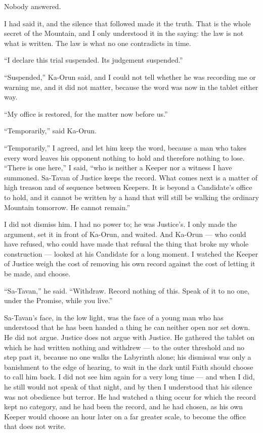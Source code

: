 Nobody answered.\par
 
I had said it, and the silence that followed made it the truth. That is the whole secret of the Mountain, and I only understood it in the saying: the law is not what is written. The law is what no one contradicts in time.\par
 
``I declare this trial suspended. Its judgement suspended.''\par
 
``Suspended,'' Ka-Orun said, and I could not tell whether he was recording me or warning me, and it did not matter, because the word was now in the tablet either way.\par
 
``My office is restored, for the matter now before us.''\par
 
``Temporarily,'' said Ka-Orun.\par
 
``Temporarily,'' I agreed, and let him keep the word, because a man who takes every word leaves his opponent nothing to hold and therefore nothing to lose. ``There is one here,'' I said, ``who is neither a Keeper nor a witness I have summoned. Sa-Tavan of Justice keeps the record. What comes next is a matter of high treason and of sequence between Keepers. It is beyond a Candidate's office to hold, and it cannot be written by a hand that will still be walking the ordinary Mountain tomorrow. He cannot remain.''\par
 
I did not dismiss him. I had no power to; he was Justice's. I only made the argument, set it in front of Ka-Orun, and waited. And Ka-Orun — who could have refused, who could have made that refusal the thing that broke my whole construction — looked at his Candidate for a long moment. I watched the Keeper of Justice weigh the cost of removing his own record against the cost of letting it be made, and choose.\par
 
``Sa-Tavan,'' he said. ``Withdraw. Record nothing of this. Speak of it to no one, under the Promise, while you live.''\par
 
Sa-Tavan's face, in the low light, was the face of a young man who has understood that he has been handed a thing he can neither open nor set down. He did not argue. Justice does not argue with Justice. He gathered the tablet on which he had written nothing and withdrew — to the outer threshold and no step past it, because no one walks the Labyrinth alone; his dismissal was only a banishment to the edge of hearing, to wait in the dark until Faith should choose to call him back. I did not see him again for a very long time — and when I did, he still would not speak of that night, and by then I understood that his silence was not obedience but terror. He had watched a thing occur for which the record kept no category, and he had been the record, and he had chosen, as his own Keeper would choose an hour later on a far greater scale, to become the office that does not write.\par
 
